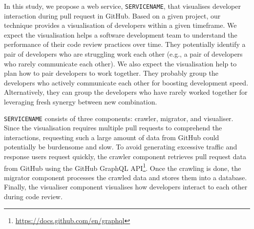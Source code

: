 \documentclass[sigconf]{acmart}
\newcommand{\service}{{\tt SERVICENAME}\xspace}
\begin{document}
In this study, we propose a web service, \service, that visualises developer interaction during pull request in GitHub.
Based on a given project, our technique provides a visualisation of developers within a given timeframe.
We expect the visualisation helps a software development team to understand the performance of their code review practices over time.
They potentially identify a pair of developers who are struggling work each other (e.g., a pair of developers who rarely communicate each other).
We also expect the visualisation help to plan how to pair developers to work together.
They probably group the developers who actively communicate each other for boosting development speed.
Alternatively, they can group the developers who have rarely worked together for leveraging fresh synergy between new combination.

\service  consists of three components: crawler, migrator, and visualiser.
Since the visualisation requires multiple pull requests to comprehend the interactions, requesting such a large amount of data from GitHub could potentially be burdensome and slow.
To avoid generating excessive traffic and response users request quickly, the crawler component retrieves pull request data from GitHub using the GitHub GraphQL API\footnote{\url{https://docs.github.com/en/graphql}}.
Once the crawling is done, the migrator component processes the crawled data and stores them into a database.
Finally, the visualiser component visualises how developers interact to each other during code review.
\end{document}
